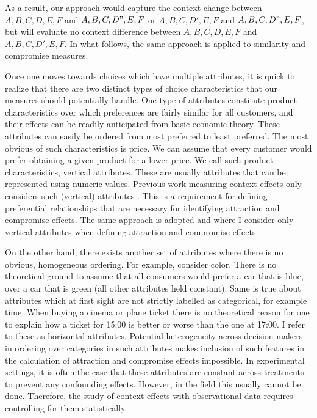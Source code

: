 \documentclass[a4paper,12pt]{article}
\begin{document}
As a result, our approach would capture the context change between ${A, B, C, D, E, F}$ and ${A, B, C, D", E, F}$ or ${A, B, C, D', E, F}$ and ${A, B, C, D", E, F}$, but will evaluate no context difference between ${A, B, C, D, E, F}$ and ${A, B, C, D', E, F}$. In what follows, the same approach is applied to similarity and compromise measures.

Once one moves towards choices which have multiple attributes, it is quick to realize that there are two distinct types of choice characteristics that our measures should potentially handle. One type of attributes constitute product characteristics over which preferences are fairly similar for all customers, and their effects can be readily anticipated from basic economic theory. These attributes can easily be ordered from most preferred to least preferred. The most obvious of such characteristics is price. We can assume that every customer would prefer obtaining a given product for a lower price. We call such product characteristics, vertical attributes. These are usually attributes that can be represented using numeric values. Previous work measuring context effects only considers such (vertical) attributes \citep{trueblood2014multiattribute, noguchi2018multialternative, noguchi2014attraction}. This is a requirement for defining preferential relationships that are necessary for identifying attraction and compromise effects. The same approach is adopted and where I consider only vertical attributes when defining attraction and compromise effects.

On the other hand, there exists another set of attributes where there is no obvious, homogeneous ordering. For example, consider color. There is no theoretical ground to assume that all consumers would prefer a car that is blue, over a car that is green (all other attributes held constant). Same is true about attributes which at first sight are not strictly labelled as categorical, for example time. When buying a cinema or plane ticket there is no theoretical reason for one to explain how a ticket for 15:00 is better or worse than the one at 17:00.  I refer to these as horizontal attributes. Potential heterogeneity across decision-makers in ordering over categories in such attributes makes inclusion of such features in the calculation of attraction and compromise effects impossible. In experimental settings, it is often the case that these attributes are constant across treatments to prevent any confounding effects. However, in the field this usually cannot be done. Therefore, the study of context effects with observational data requires controlling for them statistically. 
\end{document}
